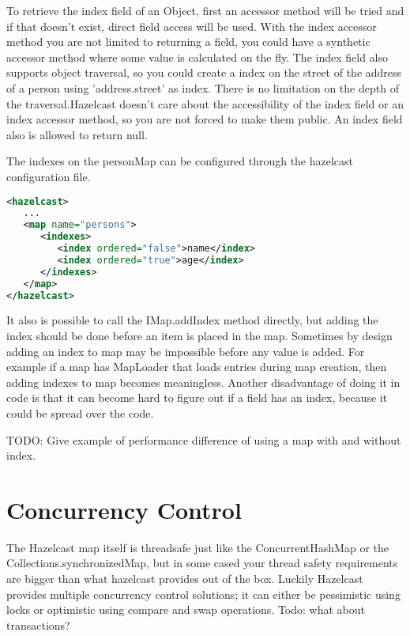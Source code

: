 To retrieve the index field of an Object, first an accessor method will be tried and if that doesn't exist, direct field access will be used. With the index accessor method you are not limited to returning a field, you could have a synthetic accessor method where some value is calculated on the fly. The index field also supports object traversal, so you could create a index on the street of the address of a person using 'address.street' as index. There is no limitation on the depth of the traversal.Hazelcast doesn't care about the accessibility of the index field or an index accessor method, so you are not forced to make them public. An index field also is allowed to return null.

The indexes on the personMap can be configured through the hazelcast configuration file. 
\begin{lstlisting}[language=xml]
<hazelcast>
   ...
   <map name="persons">
      <indexes>
         <index ordered="false">name</index>
         <index ordered="true">age</index>
      </indexes>
   </map>
</hazelcast>
\end{lstlisting}
It also is possible to call the IMap.addIndex method directly, but adding the index should be done before an item is placed in the map. Sometimes by design adding an index to map may be impossible before any value is added. For example if a map has MapLoader that loads entries during map creation, then adding indexes to map becomes meaningless. Another disadvantage of doing it in code is that it can become hard to figure out if a field has an index, because it could be spread over the code.


TODO: Give example of performance difference of using a map with and without index.

\section{Concurrency Control}
The Hazelcast map itself is threadsafe just like the ConcurrentHashMap or the Collections.synchronizedMap, but in some cased your thread safety requirements are bigger than what hazelcast provides out of the box. Luckily Hazelcast provides multiple concurrency control solutions;  it can either be pessimistic using locks or optimistic using compare and swap operations. Todo: what about transactions?

